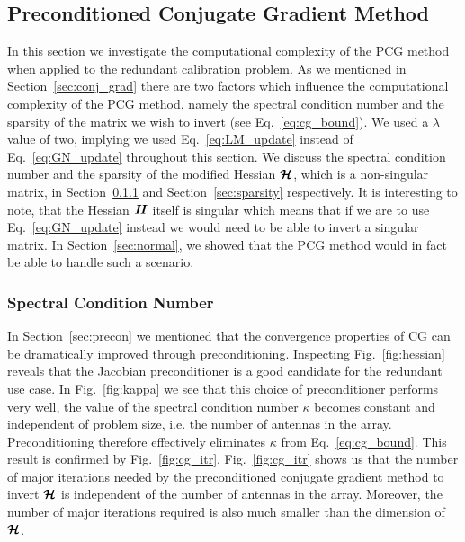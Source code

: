 \documentclass[useAMS,usenatbib]{mn2e}
\newcommand{\bH}{\bmath{H}}
\newcommand{\bmH}{\bmath{\mathcal{H}}}
\begin{document}
\subsection{Preconditioned Conjugate Gradient Method}
\label{sec:pcg}
In this section we investigate the computational complexity of the PCG method when applied to the redundant calibration problem. 
As we mentioned in Section~\ref{sec:conj_grad} there are two factors which influence the computational complexity of the PCG method, namely the spectral condition number and the sparsity of the matrix we wish to invert (see Eq.~\eqref{eq:cg_bound}). 
We used a $\lambda$ value of two, implying we used Eq.~\eqref{eq:LM_update} instead of Eq.~\eqref{eq:GN_update} throughout this section.
We discuss the spectral condition number and the sparsity of the modified Hessian $\bmH$, which is a non-singular matrix, in Section~\ref{sec:scn} and Section~\ref{sec:sparsity} respectively.
It is interesting to note, that the Hessian $\bH$ itself is singular which means that if we are to use Eq.~\eqref{eq:GN_update} instead we would need to be able to invert a singular matrix. In Section~\ref{sec:normal},
we showed that the PCG method would in fact be able to handle such a scenario.

\subsubsection{Spectral Condition Number}
\label{sec:scn}
In Section~\ref{sec:precon} we mentioned that the convergence properties of CG can be dramatically improved through preconditioning. Inspecting Fig.~\ref{fig:hessian} reveals that the Jacobian preconditioner
is a good candidate for the redundant use case. In Fig.~\ref{fig:kappa} we see that this choice of preconditioner performs very well, the value of the spectral condition number $\kappa$
becomes constant and independent of problem size, i.e. the number of antennas in the array. Preconditioning therefore effectively eliminates $\kappa$ from Eq.~\eqref{eq:cg_bound}. This result
is confirmed by Fig.~\ref{fig:cg_itr}. Fig.~\ref{fig:cg_itr} shows us that the number of major iterations needed by the preconditioned conjugate gradient method to invert $\bmH$ is independent of the number of antennas in the array.
Moreover, the number of major iterations required is also much smaller than the dimension of $\bmH$. 
\end{document}
